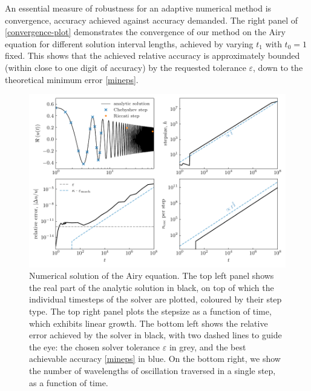 \documentclass[10pt]{article}
\newcommand{\veps}{\varepsilon}
\newcommand{\om}{\omega}
\begin{document}
An essential measure of robustness for an adaptive numerical method is convergence, accuracy achieved against accuracy demanded.
The right panel of \cref{convergence-plot} demonstrates the convergence
of our method on the Airy equation for different solution interval lengths,
achieved by varying $t_1$ with $t_0=1$ fixed.
This shows that the achieved relative accuracy is approximately bounded
(within close to one digit of accuracy)
by the requested tolerance $\varepsilon$,
down to the theoretical minimum error \eqref{mineps}.

\begin{figure}[tb]
    \centering
    \includegraphics{plots/airy-numsol.pdf}
    \caption{\label{airy-results} Numerical solution of the Airy equation. The
    top left panel shows the real part of the analytic solution in black, on
    top of which the individual timesteps of the solver are plotted, coloured
    by their step type. The top right panel plots the stepsize as a function of
    time, which exhibits linear growth. The bottom left shows the relative
    error achieved by the solver in black, with two dashed lines to guide the
    eye: the chosen solver tolerance $\veps$ in grey, and the
    best achievable accuracy \eqref{mineps}
    in blue. On the
    bottom right, we show the number of wavelengths of oscillation traversed in
    a single step, as a function of time. 
    }
\end{figure}
\end{document}
